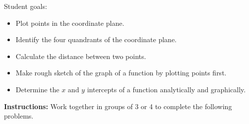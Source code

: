 


\noindent
Student goals:
  \begin{itemize}
  \item Plot points in the coordinate plane.
  \item Identify the four quandrants of the coordinate plane.
  \item Calculate the distance between two points.
  \item Make rough sketch of the graph of a function by plotting
    points first.
  \item Determine the $x$ and $y$ intercepts of a function
    analytically and graphically.
  \end{itemize}


\noindent \textbf{Instructions:}  Work together in groups of  3 or 4 to complete the following problems.


